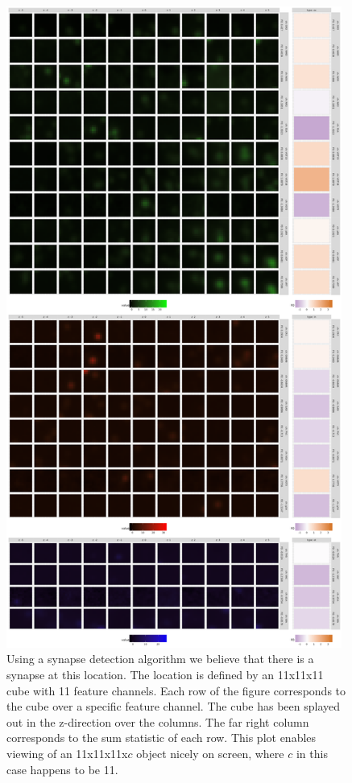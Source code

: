 \documentclass[simplex.tex]{subfiles}
\begin{document}
\begin{figure}[!h]
\begin{cframed}
\centering
\includegraphics[width=0.98\textwidth, clip = true, trim = 0in 18in 0in 0in]{../../figs/exampleC1212testkristina15x108_y5965_z22.png}
\caption{
  Using a synapse detection algorithm we believe that there is a synapse
  at this location.  The location is defined by an 11x11x11 cube with 11
  feature channels. Each row of the figure corresponds to the cube over
  a specific feature channel.  The cube has been splayed out in the
  z-direction over the columns. The far right column corresponds to the
  sum statistic of each row.  This plot enables viewing of an
  11x11x11x$c$ object nicely on screen, where $c$ in this case happens
  to be 11. 
}
\label{fig:meda:synaptogram}
\end{cframed}
\end{figure}
\end{document}
